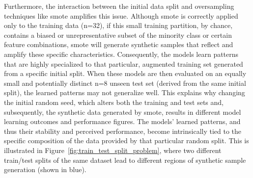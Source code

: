 \documentclass[12pt,a4paper]{report}
\begin{document}
Furthermore, the interaction between the initial data split and oversampling techniques like \gls{smote} amplifies this issue. Although \gls{smote} is correctly applied only to the training data (n=32), if this small training partition, by chance, contains a biased or unrepresentative subset of the minority class or certain feature combinations, \gls{smote} will generate synthetic samples that reflect and amplify these specific characteristics. Consequently, the models learn patterns that are highly specialized to that particular, augmented training set generated from a specific initial split. When these models are then evaluated on an equally small and potentially distinct n=8 unseen test set (derived from the same initial split), the learned patterns may not generalize well. This explains why changing the initial random seed, which alters both the training and test sets and, subsequently, the synthetic data generated by \gls{smote}, results in different model learning outcomes and performance figures. The models' learned patterns, and thus their stability and perceived performance, become intrinsically tied to the specific composition of the data provided by that particular random split. This is illustrated in Figure~\ref{fig:train_test_split_problem}, where two different train/test splits of the same dataset lead to different regions of synthetic sample generation (shown in blue).
\end{document}
